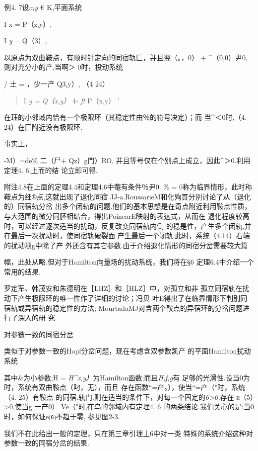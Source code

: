 \documentclass{article}
\begin{document}
例4. 7设\emph{x,y} € K,平面系统

I x = P（z,y）,

I \emph{y} = Q（3）,

以原点为双曲鞍点，有顺时针定向的同宿轨匚，并且翌（。，0） +
\^{}（0,0）尹0,则对充分小的\textbar{}产\textbar{},当啊＞ 0时，投动系统

/ 土 = ，少一产 Q3,y）, （4 24）

\begin{quote}
I \emph{y = Q（x,y）} 4- \emph{ft} P（x,y） '
\end{quote}

在珏的小邻域内恰有一个极限环（其稳定性由％的符号决定）；而
当\^{}＜0时,（4. 24）在匚附近没有极限环.

事实上，

-M）=de\% 二（尸+ Qz）\textbar{}g門）RO,
并且等号仅在个别点上成立，因此\^{}＞0.利用定理4. 6,上而的结 论立即可得.

附注4.8在上面的定理4.4和定理4.6中菴有条件％尹0. \% =
0称为临界情形，此时称鞍点为细®点,这就出现了退化同宿
JJ-a.RoussarieM和化殉貫分别讨论了从（退化的）同宿轨分岔
出多个闭轨的问题.他们的基本思想是在奇点附近利用鞍点性质，
与大范围的微分同胚相结合，得出PoincarE映射的表达式，从而在
退化程度较高时，可以经过逐次适当的扰动，反复改变同宿轨内侧
的稳是性，产生多个闭轨,并在最后一次扰动时，使同宿轨破裂面
产生最后一个闭轨.此时，系统（4.14）右端的扰动项g中除了产
外还含有其它参数.由于介绍退化情形的同宿分岔需要较大篇

幅，此处从略.但对于Hamilton向量场的扰动系统，我们将在§6
定理6.4中介绍一个常用的结果.

罗定军、韩茂安和朱德明在［LHZ］和［HLZ］中，对孤立和非
孤立同宿轨在扰动下产生极限环的唯一性作了详细的讨论；冯贝
叶E得出了在临界情形下判别同宿轨或异宿轨的稳定性的方法;
MourtadaMJ对含两个鞍点的异宿环的分岔问题进行了深入的研 究.

对参數一致的同宿分岔

类似于对参数一致的Hopf分岔问题，现在考虑含双参数凯产
的平面Hamilton扰动系统

其中\&为小参数;H = \emph{H\^{}x,y）}为Hamilton函数;而且\emph{H,f,g}有
足够的光滑性.设当0为时，系统有双曲鞍点（叼，无），而且
存在函数``=产。），使当``=产（"时，系统（4. 25）有鞍点
的同宿.轨门.则在适当的条件下，对每一个固定的\emph{6\textgreater{}0,}存在
\textsc{e（5）\textgreater{}0,}使当g 一产0）\textbar{}
Ve（"时,在乌的邻域内有定理4. 6
的两条结论.我们关心的是:当0时，如何保证e⑹不趋于零, 参见图2-3.

我们不在此给出一般的定理，只在第三章引理丄6中对一类
特殊的系统介绍这种对参数一致的同宿分岔的结果.
\end{document}
